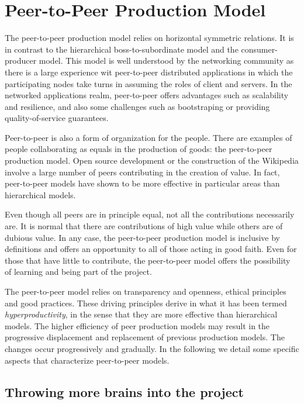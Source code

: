 \documentclass[journal]{IEEEtran}
\begin{document}
\section{Peer-to-Peer Production Model}
The peer-to-peer production model \cite{bauwens2009class} relies on horizontal symmetric relations.
It is in contrast to the hierarchical boss-to-subordinate model and the consumer-producer model.
This model is well understood by the networking community as there is a large experience wit peer-to-peer distributed applications in which the participating nodes take turns in assuming the roles of client and servers.
In the networked applications realm, peer-to-peer offers advantages such as scalability and resilience, and also some challenges such as bootstraping or providing quality-of-service guarantees.

Peer-to-peer is also a form of organization for the people.
There are examples of people collaborating as equals in the production of goods: the peer-to-peer production model.
Open source development or the construction of the Wikipedia involve a large number of peers contributing in the creation of value.
In fact, peer-to-peer models have shown to be more effective in particular areas than hierarchical models.

Even though all peers are in principle equal, not all the contributions necessarily are.
It is normal that there are contributions of high value while others are of dubious value.
In any case, the peer-to-peer production model is inclusive by definitions and offers an opportunity to all of those acting in good faith.
Even for those that have little to contribute, the peer-to-peer model offers the possibility of learning and being part of the project.

The peer-to-peer model relies on transparency and openness, ethical principles and good practices.
These driving principles derive in what it has been termed \emph{hyperproductivity}, in the sense that they are more effective than hierarchical models.
The higher efficiency of peer production models may result in the progressive displacement and replacement of previous production models.
The changes occur progressively and gradually.
In the following we detail some specific aspects that characterize peer-to-peer models.

\subsection{Throwing more brains into the project}
\end{document}

